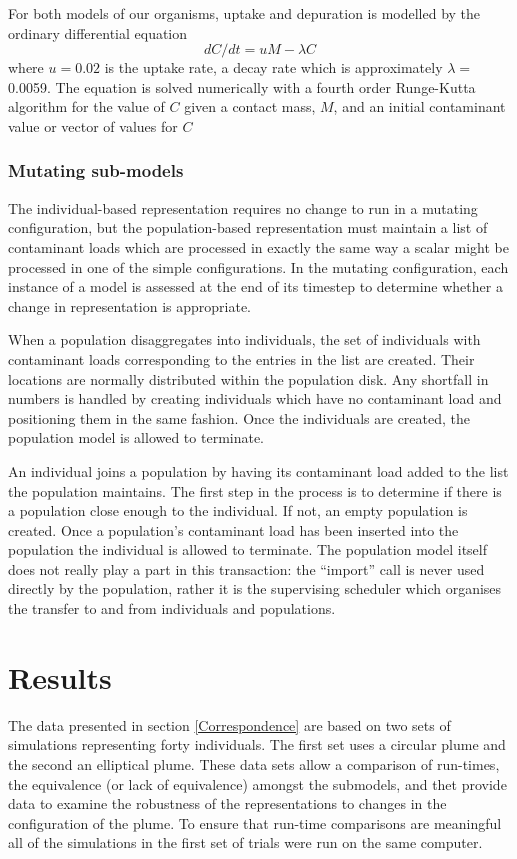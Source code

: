 For both models of our organisms, uptake and depuration is modelled by the
ordinary differential equation
\[ d C / d t = u M - \lambda C \]
where $u = 0.02$ is the uptake rate, a decay rate which is approximately
$\lambda =$0.0059. The equation is solved numerically with a fourth order
Runge-Kutta algorithm for the value of $C$ given a contact mass, $M$, and an
initial contaminant value or vector of values for $C$

\subsubsection{Mutating sub-models}

The individual-based representation requires no change to run in a mutating
configuration, but the population-based representation must maintain a list of
contaminant loads which are processed in exactly the same way a scalar might
be processed in one of the simple configurations. In the mutating
configuration, each instance of a model is assessed at the end of its timestep
to determine whether a change in representation is appropriate.

When a population disaggregates into individuals, the set of individuals with
contaminant loads corresponding to the entries in the list are created. Their
locations are normally distributed within the population disk. Any shortfall
in numbers is handled by creating individuals which have no contaminant load
and positioning them in the same fashion. Once the individuals are created,
the population model is allowed to terminate.

An individual joins a population by having its contaminant load added to the
list the population maintains. The first step in the process is to determine
if there is a population close enough to the individual. If not, an empty
population is created. Once a population's contaminant load has been inserted
into the population the individual is allowed to terminate. The population
model itself does not really play a part in this transaction: the ``import''
call is never used directly by the population, rather it is the supervising
scheduler which organises the transfer to and from individuals and
populations.

\section{Results}\label{Results}

The data presented in section \ref{Correspondence} are based on two sets of
simulations representing forty individuals. The first set uses a circular
plume and the second an elliptical plume. These data sets allow a comparison
of run-times, the equivalence (or lack of equivalence) amongst the submodels,
and thet provide data to examine the robustness of the representations to
changes in the configuration of the plume. To ensure that run-time comparisons
are meaningful all of the simulations in the first set of trials were run on
the same computer.

